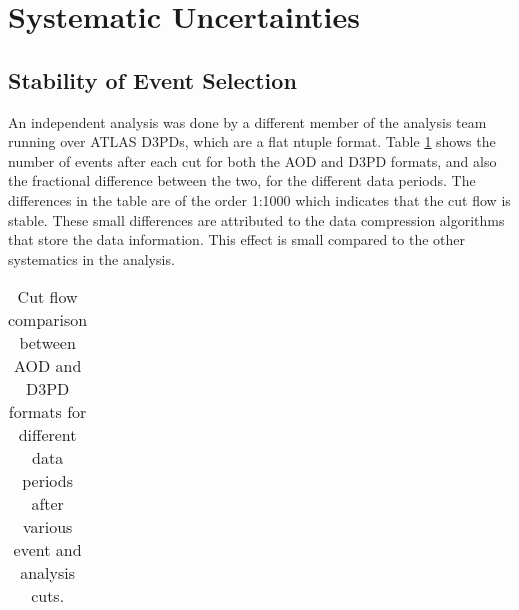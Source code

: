 \section{Systematic Uncertainties}
\label{sec:GBJ1:DataStab}

\subsection{Stability of Event Selection}
\label{sec:GBJ1:AODD3PD}

An independent analysis was done by a different member of the analysis team running over ATLAS D3PDs, which are a flat ntuple format. 
Table \ref{GBJ1:CutFlow} shows the number of events after each cut for both the AOD and D3PD formats, and also the fractional difference between the two, for the different data periods. 
The differences in the table are of the order 1:1000 which indicates that the cut flow is stable.  
These small differences are attributed to the data compression algorithms that store the data information.
This effect is small compared to the other systematics in the analysis.
   
\begin{table}
\small
\footnotesize

\begin{tabular}{|c|c|c|c|c|c|c|c|}
\hline
%

%
\hline
\end{tabular}
\caption[Cut flow comparison between ATLAS AOD and D3PD formats]{
Cut flow comparison between AOD and D3PD formats for different data periods after various event and analysis cuts.
}
\label{GBJ1:CutFlow}
\end{table}
